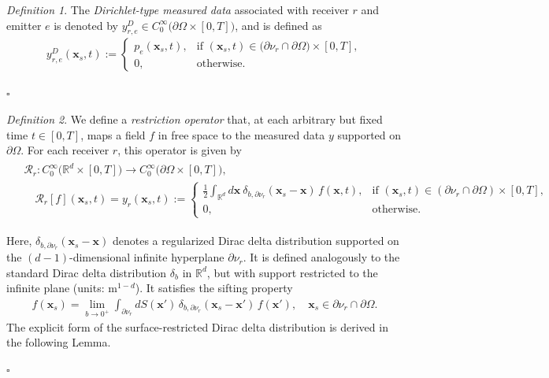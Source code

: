 \documentclass[11pt,reqno]{amsart}
\theoremstyle{remark}
\newtheorem{definition}{Definition}
\theoremstyle{italic_lemma}
\newcommand{\bx}{\boldsymbol{x}}
\begin{document}
\begin{definition}  \label{def:measured-data-Dirichlet}
    The \emph{Dirichlet-type measured data} associated with receiver \( r \) and emitter \( e \) is denoted by \( y_{r,e}^D \in C_0^{\infty} \big( \partial \Omega \times [0,T] \big) \), and is defined as
    \begin{align}
        y_{r,e}^D(\bx_s, t) := 
        \begin{cases}
            \displaystyle p_e(\bx_s, t), & \text{if } (\bx_s, t) \in \big( \partial \nu_r \cap \partial \Omega \big) \times [0,T], \\[0.5em]
            0, & \text{otherwise}.
        \end{cases}
    \end{align}
\end{definition}
\hfill\(\square\)




\begin{definition}    \label{def:r}
We define a \emph{restriction operator} that, at each arbitrary but fixed time \( t \in [0, T] \), maps a field \( f \) in free space to the measured data \( y \) supported on \( \partial \Omega \). For each receiver \( r \), this operator is given by
\begin{align} \label{eq:r}
    \begin{split}
        &\mathcal{R}_r : C_0^{\infty} \big( \mathbb{R}^d \times [0,T] \big) \to C_0^\infty \big( \partial \Omega \times [0, T] \big), \\
        &\quad \mathcal{R}_r \left[ f \right](\bx_s, t) = y_r(\bx_s, t) :=
        \begin{cases}
            \displaystyle \frac{1}{2}
            \int_{\mathbb{R}^d} d\bx \ \delta_{b, \partial \nu_r}(\bx_s - \bx) \, f(\bx,t), & \text{if } (\bx_s, t) \in (\partial \nu_r \cap \partial \Omega) \times [0, T], \\
            0, & \text{otherwise}.
        \end{cases}
    \end{split}
\end{align}

\noindent
Here, \( \delta_{b,\partial \nu_r}(\bx_s - \bx) \) denotes a regularized Dirac delta distribution supported on the \((d{-}1)\)-dimensional infinite hyperplane \( \partial \nu_r  \). It is defined analogously to the standard Dirac delta distribution \( \delta_b \) in \( \mathbb{R}^d \), but with support restricted to the infinite plane (units: \( \mathrm{m}^{1-d} \)). It satisfies the sifting property
\begin{align} \label{eq:sifting-surface}
    f(\bx_s) = \lim_{b \to 0^+} \int_{\partial \nu_r } dS(\bx') \, \delta_{b,\partial \nu_r}(\bx_s - \bx') \, f(\bx'), \quad \bx_s \in \partial \nu_r \cap \partial \Omega.
\end{align}
The explicit form of the surface-restricted Dirac delta distribution is derived in the following Lemma.
\end{definition}
\hfill\(\square\)
\end{document}
